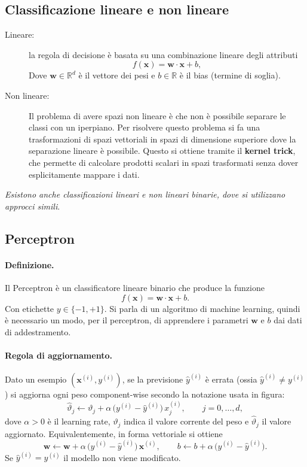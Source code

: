 \subsection{Classificazione lineare e non lineare}\label{subsec:lin-nonlin}

\begin{description}
  \item[Lineare:] la regola di decisione è basata su una combinazione lineare degli attributi
  \[
  f(\mathbf{x})=\mathbf{w}\cdot\mathbf{x}+b,
  \]
  Dove $\mathbf{w}\in\mathbb{R}^d$ è il vettore dei pesi e $b\in\mathbb{R}$ è il bias (termine di soglia). 
  \item[Non lineare:] Il problema di avere spazi non lineare è che non è possibile separare le classi con un iperpiano. Per risolvere questo problema si fa una trasformazioni di spazi vettoriali in spazi di dimensione superiore dove la separazione lineare è possibile. Questo si ottiene tramite il \textbf{kernel trick}, che permette di calcolare prodotti scalari in spazi trasformati senza dover esplicitamente mappare i dati.
\end{description}

\noindent
\textit{Esistono anche classificazioni lineari e non lineari binarie, dove si utilizzano approcci simili}.

\subsection{Perceptron}\label{subsec:perceptron}
\paragraph{Definizione.}
Il Perceptron è un classificatore lineare binario che produce la funzione
\[f(\mathbf{x})=\mathbf{w}\cdot\mathbf{x}+b.\]
Con etichette $y\in\{-1,+1\}$. Si parla di un algoritmo di machine learning, quindi è necessario un modo, per il perceptron, di apprendere i parametri $\mathbf{w}$ e $b$ dai dati di addestramento.

\paragraph{Regola di aggiornamento.}
Dato un esempio $(\mathbf{x}^{(i)},y^{(i)})$, se la previsione $\hat{y}^{(i)}$ è errata (ossia $\hat{y}^{(i)}\neq y^{(i)}$) si aggiorna ogni peso component-wise secondo la notazione usata in figura:
\[
\hat{\vartheta}_j \leftarrow \vartheta_j + \alpha\,\bigl(y^{(i)}-\hat{y}^{(i)}\bigr)\,x_j^{(i)},\qquad j=0,\dots,d,
\]
dove $\alpha>0$ è il learning rate, $\vartheta_j$ indica il valore corrente del peso e $\hat{\vartheta}_j$ il valore aggiornato. Equivalentemente, in forma vettoriale si ottiene
\[
\mathbf{w}\leftarrow \mathbf{w} + \alpha\,\bigl(y^{(i)}-\hat{y}^{(i)}\bigr)\,\mathbf{x}^{(i)},\qquad b\leftarrow b + \alpha\,\bigl(y^{(i)}-\hat{y}^{(i)}\bigr).
\]
Se $\hat{y}^{(i)}=y^{(i)}$ il modello non viene modificato.

